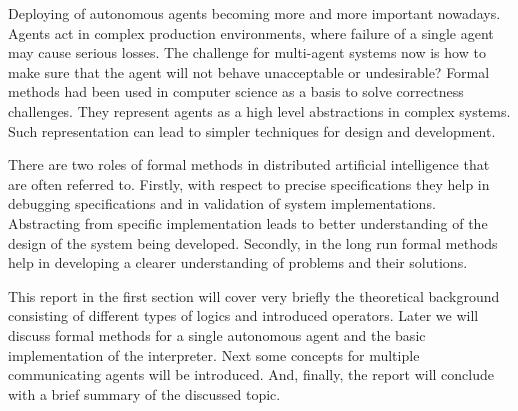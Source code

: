 Deploying of autonomous agents becoming more and more important nowadays. Agents act in complex production environments, where failure of a single agent may cause serious losses. The challenge for multi-agent systems now is how to make sure that the agent will not behave unacceptable or undesirable? Formal methods had been used in computer science as a basis to solve correctness challenges. They represent agents as a high level abstractions in complex systems. Such representation can lead to simpler techniques for design and development.

There are two roles of formal methods in distributed artificial intelligence that are often referred to. Firstly, with respect to precise specifications they help in debugging specifications and in validation of system implementations. Abstracting from specific implementation leads to better understanding of the design of the system being developed. Secondly, in the long run formal methods help in developing a clearer understanding of problems and their solutions. \cite{Singh_99}

This report in the first section will cover very briefly the theoretical background consisting of different types of logics and introduced operators. Later we will discuss formal methods for a single autonomous agent and the basic implementation of the interpreter. Next some concepts for multiple communicating agents will be introduced. And, finally, the report will conclude with a brief summary of the discussed topic. 